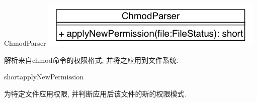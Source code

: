 \begin{XeClass}{ChmodParser}
\includegraphics[width=\textwidth]{cdig/ChmodParser.png}
     
 解析来自chmod命令的权限格式, 并将之应用到文件系统.

    \begin{XeMethod}{\XePublic}{short}{applyNewPermission}
         
 为特定文件应用权限, 并判断应用后该文件的新的权限模式.

    \end{XeMethod}

\end{XeClass}
